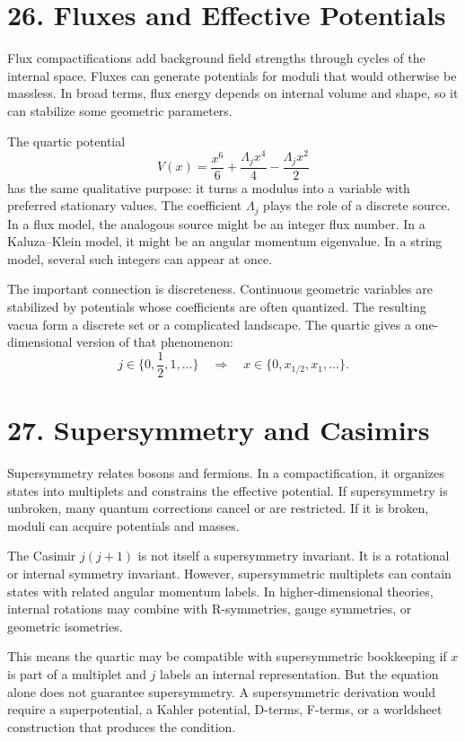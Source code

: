 \documentclass[11pt]{article}
\newcommand{\Lspin}{\Lambda_j}
\begin{document}
\section*{26. Fluxes and Effective Potentials}

Flux compactifications add background field strengths through cycles of the internal space. Fluxes can generate potentials for moduli that would otherwise be massless. In broad terms, flux energy depends on internal volume and shape, so it can stabilize some geometric parameters.

The quartic potential
\[
        V(x)=\frac{x^6}{6}+\frac{\Lspin x^4}{4}
        -\frac{\Lspin x^2}{2}
\]
has the same qualitative purpose: it turns a modulus into a variable with preferred stationary values. The coefficient \(\Lspin\) plays the role of a discrete source. In a flux model, the analogous source might be an integer flux number. In a Kaluza--Klein model, it might be an angular momentum eigenvalue. In a string model, several such integers can appear at once.

The important connection is discreteness. Continuous geometric variables are stabilized by potentials whose coefficients are often quantized. The resulting vacua form a discrete set or a complicated landscape. The quartic gives a one-dimensional version of that phenomenon:
\[
        j\in\{0,\frac12,1,\ldots\}
        \quad\Rightarrow\quad
        x\in\{0,x_{1/2},x_1,\ldots\}.
\]


\section*{27. Supersymmetry and Casimirs}

Supersymmetry relates bosons and fermions. In a compactification, it organizes states into multiplets and constrains the effective potential. If supersymmetry is unbroken, many quantum corrections cancel or are restricted. If it is broken, moduli can acquire potentials and masses.

The Casimir \(j(j+1)\) is not itself a supersymmetry invariant. It is a rotational or internal symmetry invariant. However, supersymmetric multiplets can contain states with related angular momentum labels. In higher-dimensional theories, internal rotations may combine with R-symmetries, gauge symmetries, or geometric isometries.

This means the quartic may be compatible with supersymmetric bookkeeping if \(x\) is part of a multiplet and \(j\) labels an internal representation. But the equation alone does not guarantee supersymmetry. A supersymmetric derivation would require a superpotential, a Kahler potential, D-terms, F-terms, or a worldsheet construction that produces the condition.
\end{document}
